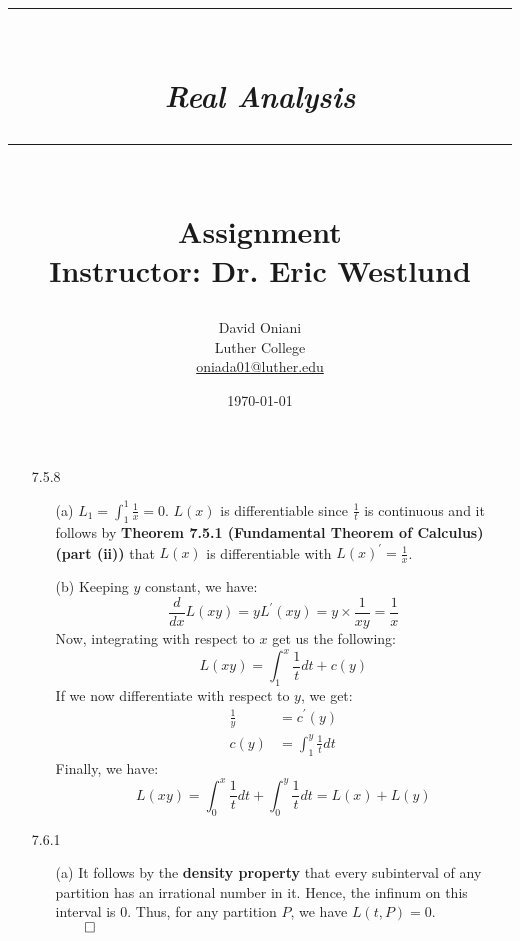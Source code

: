 \documentclass[11pt]{article}
\author{David Oniani\\
        Luther College\\
        \href{mailto:oniada01@luther.edu}{oniada01@luther.edu}}
\title{\rule{\paperwidth - 150pt}{1pt}\textbf{\\\textit{Real Analysis}\\}\rule
{\paperwidth - 150pt}{1pt}\\\textbf{Assignment \textnumero13}\\{\normalsize
Instructor: Dr. Eric Westlund}}
\date{\today}
\begin{document}
\maketitle

%
%
%

\begin{itemize}
    \item[7.5.8]
        \begin{itemize}
            \item[(a)]
                $L_1 = \int_1^1 \frac{1}{x} = 0$. $L(x)$ is differentiable
                since $\frac{1}{t}$ is continuous and it follows by
                \textbf{Theorem 7.5.1 (Fundamental Theorem of Calculus) (part
                (ii))} that $L(x)$ is differentiable with $L(x)^\prime =
                \frac{1}{x}$.

            \item[(b)]
                Keeping $y$ constant, we have:
                \begin{equation*}
                    \frac{d}{dx} L(xy) = yL^\prime(xy)
                                       = y \times \frac{1}{xy}
                                       = \frac{1}{x}
                \end{equation*}
                Now, integrating with respect to $x$ get us the following:
                \begin{equation*}
                    L(xy) = \int_1^{x} \frac{1}{t} dt + c(y)
                    \tag{$c(y)$ is a function of only $y$}
                \end{equation*}
                If we now differentiate with respect to $y$, we get:
                \begin{align}
                    \frac{1}{y} &= c^\prime(y)\\
                    c(y)        &= \int_1^y \frac{1}{t} dt
                \end{align}
                Finally, we have:
                \begin{equation*}
                    L(xy) = \int_0^x \frac{1}{t} dt + \int_0^y \frac{1}{t} dt
                          = L(x) + L(y)
                \end{equation*}
        \end{itemize}

    \item[7.6.1]
        \begin{itemize}
            \item[(a)]
                It follows by the \textbf{density property} that every
                subinterval of any partition has an irrational number in it.
                Hence, the infinum on this interval is $0$. Thus, for any
                partition $P$, we have $L(t, P) = 0$.\\
                $\qed$


\end{itemize}
\end{itemize}
\end{document}
